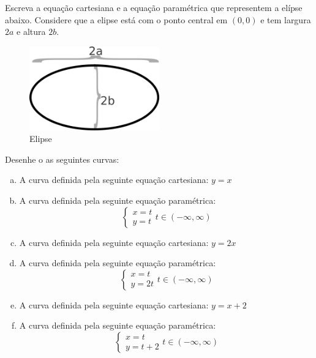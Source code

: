 \documentclass[12pt]{exam}
\begin{document}
\begin{questions}

\question Escreva a equação cartesiana e a equação paramétrica que representem a elípse abaixo. Considere que a elipse está com o ponto central em $(0, 0)$ e tem largura $2a$ e altura $2b$.

\begin{figure}[h]
    \centering
    \includegraphics[width=0.5\textwidth]{elipse}
    \caption{Elipse}
    \label{fig:elipse}
\end{figure}

\question Desenhe o as seguintes curvas:

\begin{enumerate}[a)]

\item A curva definida pela seguinte equação cartesiana: $y = x$

\item A curva definida pela seguinte equação paramétrica: 
\[\begin{cases}
    x=t\\
    y=t
\end{cases}
t\in (-\infty,\infty)\]

\item A curva definida pela seguinte equação cartesiana: $y = 2x$

\item A curva definida pela seguinte equação paramétrica: 
\[\begin{cases}
    x=t\\
    y=2t
\end{cases}
t\in (-\infty,\infty)\]

\item A curva definida pela seguinte equação cartesiana: $y = x + 2$

\item A curva definida pela seguinte equação paramétrica: 
\[\begin{cases}
    x=t\\
    y=t + 2
\end{cases}
t\in (-\infty,\infty)\]


\end{enumerate}
\end{questions}
\end{document}
